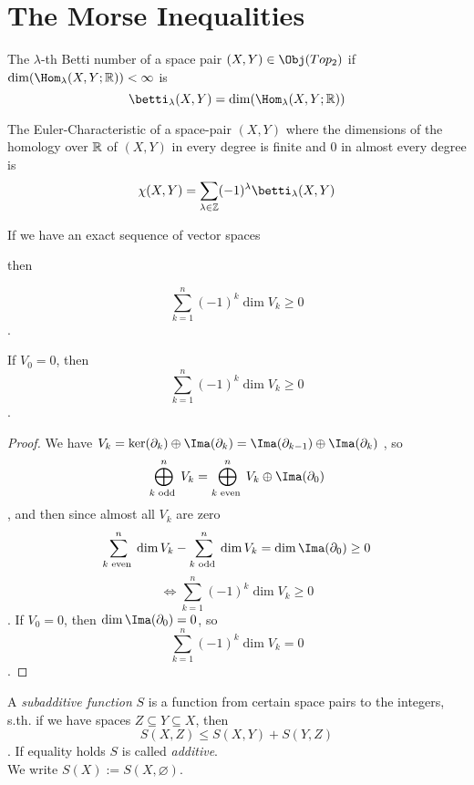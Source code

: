 \section{The Morse Inequalities}

\begin{definition}
   The $\lambda$-th Betti number of a space pair 
   $(X, Y) \in \Obj(Top_2)$ if $\dim(\Hom_{\lambda}(X, Y; \R)) < \infty$ is
   \[ \betti_{\lambda}(X, Y) = \dim(\Hom_{\lambda}(X, Y; \R)) \]

   The Euler-Characteristic of a space-pair $(X, Y)$ where the dimensions of the
   homology over ${\mathbb R}$ of $(X, Y)$ in every degree is finite and $0$ in almost 
   every degree is
   \[ \chi (X, Y) = \sum_{\lambda \in \Z} (-1)^{\lambda}\betti_{\lambda}(X, Y) \]
\end{definition}

\begin{lemma}
   \label{lemma:alternating sum}
   If we have an exact sequence of vector spaces

   \begin{figure}[H]
      \centering
   \end{figure}

   then 

   \[ \sum_{k = 1}^n (-1)^k \dim V_k \geq 0 \].

   If $V_0 = 0$, then
   \[ \sum_{k = 1}^n (-1)^k \dim V_k \geq 0 \].
\end{lemma}

\begin{proof}
   We have $V_k = \ker(\del_k) \oplus \Ima(\del_k) = \Ima(\del_{k - 1}) \oplus \Ima(\del_k)$
   , so 
   \[ \bigoplus_{k \text{ odd }}^n V_k = \bigoplus_{k \text{ even }}^n V_k \oplus \Ima (\del_0) \]
   , and then since almost all $V_k$ are zero
   \[ \sum_{k \text{ even }}^n \dim V_k - \sum_{k \text{ odd }}^n \dim V_k = \dim \Ima(\del_0) \geq 0\]
   \[ \Leftrightarrow \sum_{k = 1}^n (-1)^k \dim V_k \geq 0 \].
   If $V_0 = 0$, then $\dim \Ima(\del_0) = 0$, so
   \[ \sum_{k = 1}^n (-1)^k \dim V_k = 0 \].
\end{proof}

\begin{definition}
   A \textit{subadditive function} $S$ is a function from certain space pairs to
   the integers, s.th. if we have spaces $Z \subseteq Y \subseteq X$, then 
   \[ S(X, Z) \leq S(X, Y) + S(Y, Z) \].
   If equality holds $S$ is called \textit{additive}. \\
   We write $S(X) := S(X, \varnothing)$.
\end{definition}

